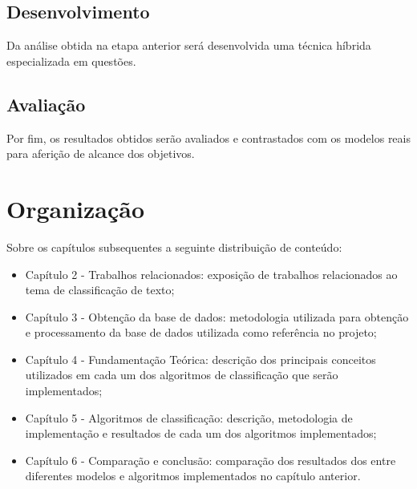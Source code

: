 \subsection{Desenvolvimento}
Da análise obtida na etapa anterior será desenvolvida uma técnica híbrida especializada em questões.
\subsection{Avaliação}
Por fim, os resultados obtidos serão avaliados e contrastados com os modelos reais para aferição de alcance dos objetivos.

\section{Organização}
Sobre os capítulos subsequentes a seguinte distribuição de conteúdo:
\begin{itemize}
\item Capítulo 2 - Trabalhos relacionados:
exposição de trabalhos relacionados ao tema de classificação de texto;
\item Capítulo 3 - Obtenção da base de dados:
metodologia utilizada para obtenção e processamento da base de dados utilizada como referência no projeto;
\item Capítulo 4 - Fundamentação Teórica:
descrição dos principais conceitos utilizados em cada um dos algoritmos de classificação que serão implementados;
\item Capítulo 5 - Algoritmos de classificação:
descrição, metodologia de implementação e resultados de cada um dos algoritmos implementados;
\item Capítulo 6 - Comparação e conclusão:
comparação dos resultados dos entre diferentes modelos e algoritmos implementados no capítulo anterior.
\end{itemize}